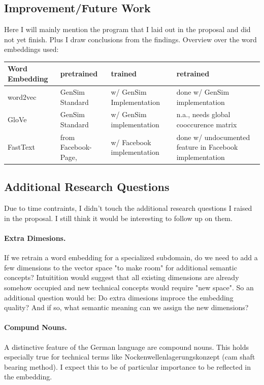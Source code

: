 \documentclass[10pt,a4paper]{article}
\begin{document}
	\subsection{Improvement/Future Work}
	Here I will mainly mention the program that I laid out in the proposal and did not yet finish. Plus I draw conclusions from the findings.
		Overview over the word embeddings used:
	\begin{center}
		\begin{tabular}{|l|p{3cm}| p{3cm}| p{3cm}|}
			\hline
			\textbf{Word Embedding} & pretrained & trained & retrained \\ 
			\hline
			word2vec  & GenSim Standard & w/ GenSim Implementation & done w/ GenSim implementation \\  
			\hline
			GloVe & GenSim Standard &w/ GenSim implementation & n.a., needs global cooccurence matrix \\  
			\hline
			FastText & from Facebook-Page,  & w/ Facebook implementation & done w/ undocumented feature in Facebook implementation\\
			\hline
      \end{tabular}	
\end{center}
	\subsection{Additional Research Questions}
	Due to time contraints, I didn't touch the additional research questions I raised in the proposal. I still think it would be interesting to follow up on them. 
	\paragraph{Extra Dimesions.} If we retrain a word embedding for a specialized subdomain, do we need to add a few dimensions to the vector space "to make room" for additional semantic concepts? Intuitition would suggest that all existing dimensions are already somehow occupied and new technical concepts would require "new space". So an additional question would be: Do extra dimesions improce the embedding quality? And if so, what semantic meaning can we assign the new dimensions? 
	\paragraph{Compund Nouns.} A distinctive feature of the German language are compound nouns. This holds especially true for technical terms like Nockenwellenlagerungskonzept (cam shaft bearing method). I expect this to be of particular importance to be reflected in the embedding. 
	
\end{document}
